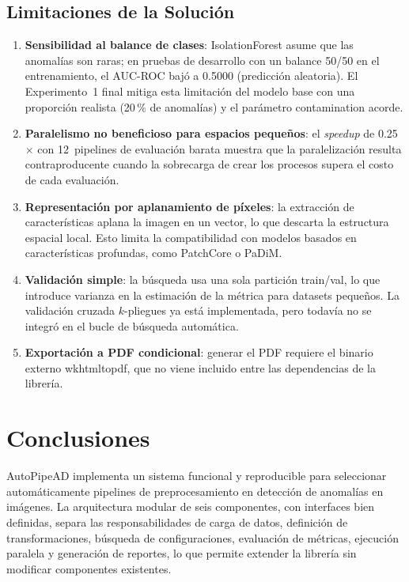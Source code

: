 \documentclass[conference,spanish]{IEEEtran}
\begin{document}
\subsection{Limitaciones de la Solución}

\begin{enumerate}
\item \textbf{Sensibilidad al balance de clases}: IsolationForest asume
  que las anomalías son raras; en pruebas de desarrollo con un balance
  50/50 en el entrenamiento, el AUC-ROC bajó a 0.5000 (predicción
  aleatoria). El Experimento~1 final mitiga esta limitación del modelo
  base con una proporción realista (20\,\% de anomalías) y el parámetro contamination acorde.
\item \textbf{Paralelismo no beneficioso para espacios pequeños}: el
  \textit{speedup} de 0.25$\times$ con 12~pipelines de evaluación barata
  muestra que la paralelización resulta contraproducente cuando la
  sobrecarga de crear los procesos supera el costo de cada evaluación.
\item \textbf{Representación por aplanamiento de píxeles}: la extracción
  de características aplana la imagen en un vector, lo que descarta la
  estructura espacial local. Esto limita la compatibilidad con modelos
  basados en características profundas, como PatchCore o PaDiM.
\item \textbf{Validación simple}: la búsqueda usa una sola partición
  train/val, lo que introduce varianza en la estimación
  de la métrica para datasets pequeños. La validación cruzada $k$-pliegues
  ya está implementada, pero todavía no se integró
  en el bucle de búsqueda automática.
\item \textbf{Exportación a PDF condicional}: generar el PDF requiere el
  binario externo wkhtmltopdf, que no viene incluido entre las
  dependencias de la librería.
\end{enumerate}

\section{Conclusiones}

AutoPipeAD implementa un sistema funcional y reproducible para seleccionar
automáticamente pipelines de preprocesamiento en detección de anomalías en
imágenes. La arquitectura modular de seis componentes, con interfaces bien
definidas, separa las responsabilidades de carga de datos, definición de
transformaciones, búsqueda de configuraciones, evaluación de métricas,
ejecución paralela y generación de reportes, lo que permite extender la
librería sin modificar componentes existentes.
\end{document}
